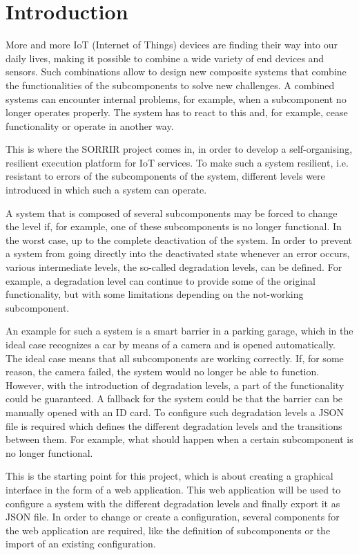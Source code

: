 \chapter{Introduction}
\label{sec:intro}

More and more IoT (Internet of Things) devices are finding their way into our daily lives, making it possible to combine a wide variety of end devices and sensors. Such combinations allow to design new composite systems that combine the functionalities of the subcomponents to solve new challenges. A combined systems can encounter internal problems, for example, when a subcomponent no longer operates properly. The system has to react to this and, for example, cease functionality or operate in another way.

This is where the SORRIR project comes in, in order to develop a self-organising, resilient execution platform for IoT services. To make such a system resilient, i.e. resistant to errors of the subcomponents of the system, different levels were introduced in which such a system can operate. 

A system that is composed of several subcomponents may be forced to change the level if, for example, one of these subcomponents is no longer functional. In the worst case, up to the complete deactivation of the system. In order to prevent a system from going directly into the deactivated state whenever an error occurs, various intermediate levels, the so-called degradation levels, can be defined. For example, a degradation level can continue to provide some of the original functionality, but with some limitations depending on the not-working subcomponent.

An example for such a system is a smart barrier in a parking garage, which in the ideal case recognizes a car by means of a camera and is opened automatically. The ideal case means that all subcomponents are working correctly. If, for some reason, the camera failed, the system would no longer be able to function. However, with the introduction of degradation levels, a part of the functionality could be guaranteed. A fallback for the system could be that the barrier can be manually opened with an ID card. To configure such degradation levels a JSON file is required which defines the different degradation levels and the transitions between them. For example, what should happen when a certain subcomponent is no longer functional.

This is the starting point for this project, which is about creating a graphical interface in the form of a web application. This web application will be used to configure a system with the different degradation levels and finally export it as JSON file. In order to change or create a configuration, several components for the web application are required, like the definition of subcomponents or the import of an existing configuration. 

